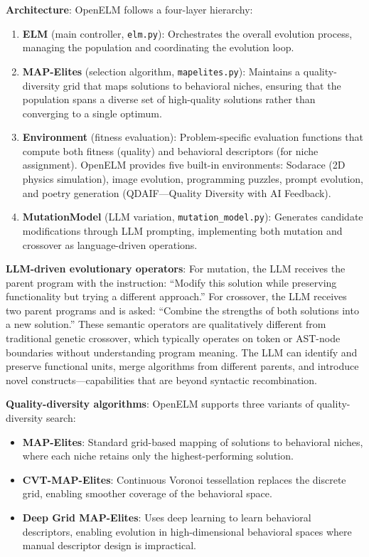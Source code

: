 \textbf{Architecture}: OpenELM follows a four-layer hierarchy:
\begin{enumerate}
\item \textbf{ELM} (main controller, \texttt{elm.py}): Orchestrates the overall evolution process, managing the population and coordinating the evolution loop.
\item \textbf{MAP-Elites} (selection algorithm, \texttt{mapelites.py}): Maintains a quality-diversity grid that maps solutions to behavioral niches, ensuring that the population spans a diverse set of high-quality solutions rather than converging to a single optimum.
\item \textbf{Environment} (fitness evaluation): Problem-specific evaluation functions that compute both fitness (quality) and behavioral descriptors (for niche assignment). OpenELM provides five built-in environments: Sodarace (2D physics simulation), image evolution, programming puzzles, prompt evolution, and poetry generation (QDAIF---Quality Diversity with AI Feedback).
\item \textbf{MutationModel} (LLM variation, \texttt{mutation\_model.py}): Generates candidate modifications through LLM prompting, implementing both mutation and crossover as language-driven operations.
\end{enumerate}

\textbf{LLM-driven evolutionary operators}: For mutation, the LLM receives the parent program with the instruction: ``Modify this solution while preserving functionality but trying a different approach.'' For crossover, the LLM receives two parent programs and is asked: ``Combine the strengths of both solutions into a new solution.'' These semantic operators are qualitatively different from traditional genetic crossover, which typically operates on token or AST-node boundaries without understanding program meaning. The LLM can identify and preserve functional units, merge algorithms from different parents, and introduce novel constructs---capabilities that are beyond syntactic recombination.

\textbf{Quality-diversity algorithms}: OpenELM supports three variants of quality-diversity search:
\begin{itemize}
\item \textbf{MAP-Elites}: Standard grid-based mapping of solutions to behavioral niches, where each niche retains only the highest-performing solution.
\item \textbf{CVT-MAP-Elites}: Continuous Voronoi tessellation replaces the discrete grid, enabling smoother coverage of the behavioral space.
\item \textbf{Deep Grid MAP-Elites}: Uses deep learning to learn behavioral descriptors, enabling evolution in high-dimensional behavioral spaces where manual descriptor design is impractical.
\end{itemize}

